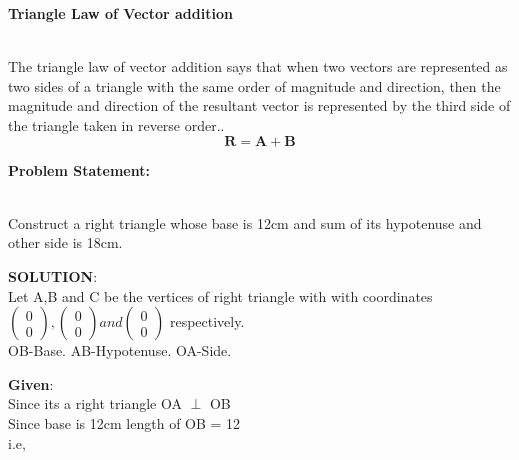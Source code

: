 \documentclass[10pt,a4paper]{report}
\let\vec\mathbf
\begin{document}
\begin{multicols}{2}

\textbf{Triangle Law of Vector addition }
\vspace{0.5cm}\raggedright \\
The triangle law of vector addition says that when two vectors are represented as two sides of a triangle with the same order of magnitude and direction, then the magnitude and direction of the resultant vector is represented by the third side of the triangle taken in reverse order..\vspace{3mm} \\ 
\begin{equation}
\vec{R}=\vec{A}+\vec{B} 
\end{equation}
\raggedright \textbf{Problem Statement:}\vspace{2mm}
\raggedright \\Construct a right triangle whose base is 12cm and sum of its hypotenuse and other side is 18cm.\\
\vspace{5mm}
\raggedright \textbf{SOLUTION}:\vspace{2mm}\\
Let A,B and C be the vertices of right triangle with with coordinates $\begin{pmatrix}
0 \\
0 
\end{pmatrix} 
, \begin{pmatrix}
0 \\
0 
\end{pmatrix} 
 and \begin{pmatrix}
0 \\
0 
\end{pmatrix} $
\vspace{1mm} respectively.\vspace{2mm}\\
OB-Base.
AB-Hypotenuse.
OA-Side.\\\vspace{2mm}
\raggedright \textbf{Given}:\vspace{2mm}\\
Since its a right triangle OA $\perp$ OB \\\vspace{2mm}
Since base is 12cm length of OB = 12  \\i.e,\\

\end{multicols}
\end{document}
